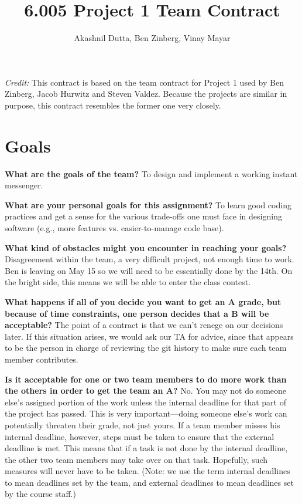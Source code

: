 \documentclass[11pt]{article}
\title{6.005 Project 1 Team Contract}
\author{Akashnil Dutta, Ben Zinberg, Vinay Mayar}
\newcommand{\question}[2]{{\noindent\bf #1}\newline #2 \newline}
\begin{document}
\maketitle

{\em Credit:} This contract is based on the team contract for Project 1 used by Ben Zinberg, Jacob Hurwitz and Steven Valdez.  Because the projects are similar in purpose, this contract resembles the former one very closely.

\section{Goals}
\question{What are the goals of the team?}{
To design and implement a working instant messenger.}

\question{What are your personal goals for this assignment?}{
To learn good coding practices and get a sense for the various trade-offs one must face in designing software (e.g., more features vs. easier-to-manage code base).}

\question{What kind of obstacles might you encounter in reaching your goals?}{
Disagreement within the team, a very difficult project, not enough time to work.  Ben is leaving on May 15 so we will need to be essentially done by the 14th.  On the bright side, this means we will be able to enter the class contest.}

\question{What happens if all of you decide you want to get an A grade, but because of time constraints, one person decides that a B will be acceptable?}{
The point of a contract is that we can't renege on our decisions later. If this situation arises, we would ask our TA for advice, since that appears to be the person in charge of reviewing the git history to make sure each team member contributes.}

\question{Is it acceptable for one or two team members to do more work than the others in order to get the team an A?}{
No.  You may not do someone else's assigned portion of the work unless the internal deadline for that part of the project has passed.  This is very important---doing someone else's work can potentially threaten their grade, not just yours.  If a team member misses his internal deadline, however, steps must be taken to ensure that the external deadline is met.  This means that if a task is not done by the internal deadline, the other two team members may take over on that task.  Hopefully, such measures will never have to be taken. (Note: we use the term internal deadlines to mean deadlines set by the team, and external deadlines to mean deadlines set by the course staff.)}
\end{document}
